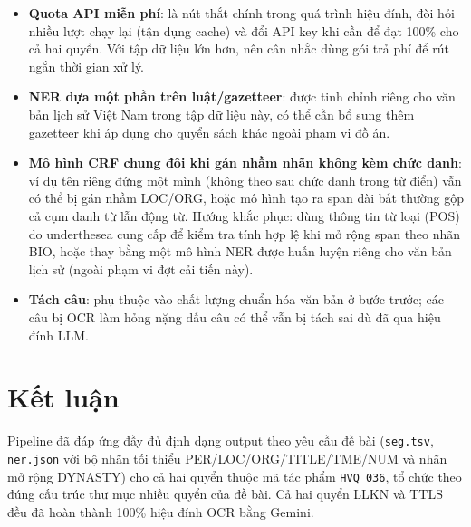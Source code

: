 \documentclass[12pt,a4paper]{article}
\begin{document}
\begin{itemize}
  \item \textbf{Quota API miễn phí}: là nút thắt chính trong quá trình hiệu
    đính, đòi hỏi nhiều lượt chạy lại (tận dụng cache) và đổi API key khi cần
    để đạt 100\% cho cả hai quyển. Với tập dữ liệu lớn hơn, nên cân nhắc dùng
    gói trả phí để rút ngắn thời gian xử lý.
  \item \textbf{NER dựa một phần trên luật/gazetteer}: được tinh chỉnh riêng
    cho văn bản lịch sử Việt Nam trong tập dữ liệu này, có thể cần bổ sung
    thêm gazetteer khi áp dụng cho quyển sách khác ngoài phạm vi đồ án.
  \item \textbf{Mô hình CRF chung đôi khi gán nhầm nhãn không kèm chức danh}:
    ví dụ tên riêng đứng một mình (không theo sau chức danh trong từ điển)
    vẫn có thể bị gán nhầm LOC/ORG, hoặc mô hình tạo ra span dài bất thường
    gộp cả cụm danh từ lẫn động từ. Hướng khắc phục: dùng thông tin từ loại
    (POS) do underthesea cung cấp để kiểm tra tính hợp lệ khi mở rộng span
    theo nhãn BIO, hoặc thay bằng một mô hình NER được huấn luyện riêng cho
    văn bản lịch sử (ngoài phạm vi đợt cải tiến này).
  \item \textbf{Tách câu}: phụ thuộc vào chất lượng chuẩn hóa văn bản ở bước
    trước; các câu bị OCR làm hỏng nặng dấu câu có thể vẫn bị tách sai dù đã
    qua hiệu đính LLM.
\end{itemize}

\section{Kết luận}

Pipeline đã đáp ứng đầy đủ định dạng output theo yêu cầu đề bài (\texttt{seg.tsv},
\texttt{ner.json} với bộ nhãn tối thiểu PER/LOC/ORG/TITLE/TME/NUM và nhãn mở
rộng DYNASTY) cho cả hai quyển thuộc mã tác phẩm \texttt{HVQ\_036}, tổ chức
theo đúng cấu trúc thư mục nhiều quyển của đề bài. Cả hai quyển LLKN và TTLS
đều đã hoàn thành 100\% hiệu đính OCR bằng Gemini.
\end{document}
